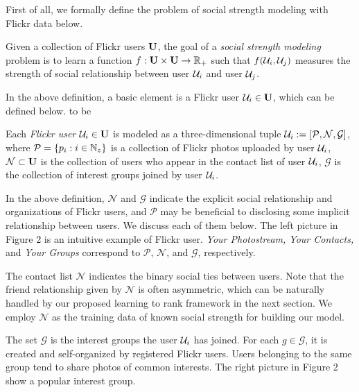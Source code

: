 First of all, we formally define the problem of social strength modeling with Flickr data below.

\begin{definition}
Given a collection of Flickr users ${\bf U}$, the goal of a {\em social strength modeling} problem is to learn a function $f:{\bf U}\times{\bf U}\rightarrow \mathbb{R}_+$ such
that $f({\cal U}_i, {\cal U}_j)$ measures the strength of social relationship between user ${\cal U}_i$ and user ${\cal U}_j$.
\end{definition}
In the above definition, a basic element is a Flickr user ${\cal U}_i\in{\bf U}$, which can be defined below. %
to be
\begin{definition}
Each {\em Flickr user} ${\cal U}_i\in{\bf U}$ is modeled as a three-dimensional tuple ${\cal U}_i:=[\mathcal P, \mathcal N, \mathcal G]$, where $\mathcal P = \{p_i:i\in{\mathbb N}_z\}$
is a collection of Flickr photos uploaded by user ${\cal U}_i$, $\mathcal N \subset {\bf U}$ is the collection of users who appear in the contact list of user ${\cal U}_i$,
$\mathcal G$ is the collection of interest groups joined by user ${\cal U}_i$.
\end{definition}
In the above definition, $\mathcal N$ and $\mathcal G$ indicate the explicit social relationship and organizations of Flickr users, and $\mathcal P$ may be
beneficial to disclosing some implicit relationship between users. We discuss each of them below. The left picture in Figure 2 is an intuitive example of Flickr
user. {\em Your Photostream, Your Contacts,} and {\em Your Groups} correspond to $\mathcal P$, $\mathcal N$, and $\mathcal G$, respectively.

The contact list $\mathcal N$ indicates the binary social ties between users. Note that the friend relationship given by $\mathcal N$ is often asymmetric, which can be naturally handled by our proposed learning to rank framework in the next section. We employ $\mathcal N$ as the training data of known social strength for building our model.


The set $\mathcal G$ is the interest groups the user ${\cal U}_i$ has joined. For each $g\in\mathcal G$, it is created and self-organized by registered Flickr users.
Users belonging to the same group tend to share photos of common interests. The right picture in Figure 2 show a popular interest group.

